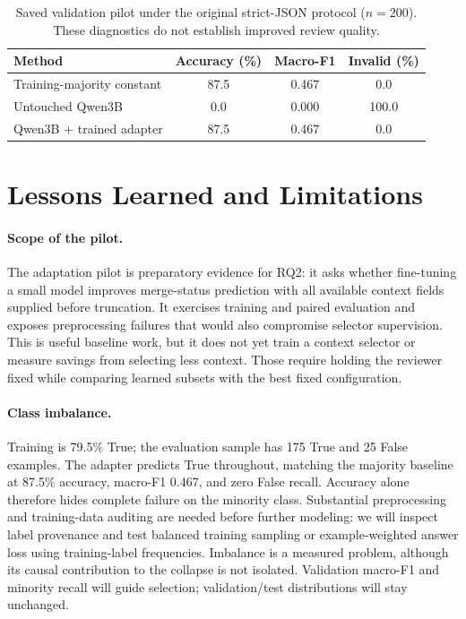 \documentclass{article}
\begin{document}
\begin{table}[ht]
\caption{Saved validation pilot under the original strict-JSON protocol ($n=200$). These diagnostics do not establish improved review quality.}
\label{tab:pilot}
\centering
\begin{tabular}{lccc}
\toprule
Method & Accuracy (\%) & Macro-F1 & Invalid (\%)\\
\midrule
Training-majority constant & 87.5 & 0.467 & 0.0\\
Untouched Qwen3B & 0.0 & 0.000 & 100.0\\
Qwen3B + trained adapter & 87.5 & 0.467 & 0.0\\
\bottomrule
\end{tabular}
\end{table}

\section{Lessons Learned and Limitations}
\paragraph{Scope of the pilot.}
The adaptation pilot is preparatory evidence for RQ2: it asks whether fine-tuning a small model improves merge-status prediction with all available context fields supplied before truncation. It exercises training and paired evaluation and exposes preprocessing failures that would also compromise selector supervision. This is useful baseline work, but it does not yet train a context selector or measure savings from selecting less context. Those require holding the reviewer fixed while comparing learned subsets with the best fixed configuration.

\paragraph{Class imbalance.}
Training is 79.5\% True; the evaluation sample has 175 True and 25 False examples. The adapter predicts True throughout, matching the majority baseline at 87.5\% accuracy, macro-F1 0.467, and zero False recall. Accuracy alone therefore hides complete failure on the minority class. Substantial preprocessing and training-data auditing are needed before further modeling: we will inspect label provenance and test balanced training sampling or example-weighted answer loss using training-label frequencies. Imbalance is a measured problem, although its causal contribution to the collapse is not isolated. Validation macro-F1 and minority recall will guide selection; validation/test distributions will stay unchanged.
\end{document}
